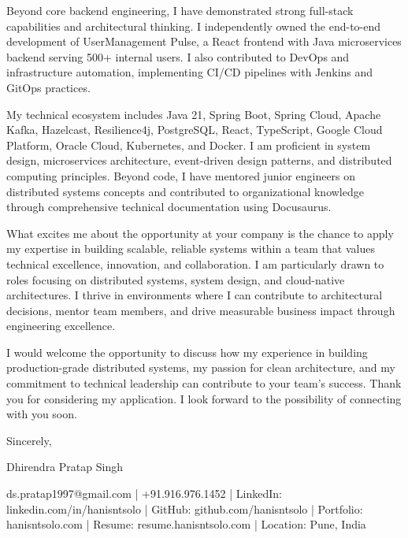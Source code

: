 \documentclass[]{hanisntsolo-resume}
\begin{document}
\vspace{0.1in}

Beyond core backend engineering, I have demonstrated strong full-stack capabilities and architectural thinking. I independently owned the end-to-end development of UserManagement Pulse, a React frontend with Java microservices backend serving 500+ internal users. I also contributed to DevOps and infrastructure automation, implementing CI/CD pipelines with Jenkins and GitOps practices.

\vspace{0.1in}

My technical ecosystem includes Java 21, Spring Boot, Spring Cloud, Apache Kafka, Hazelcast, Resilience4j, PostgreSQL, React, TypeScript, Google Cloud Platform, Oracle Cloud, Kubernetes, and Docker. I am proficient in system design, microservices architecture, event-driven design patterns, and distributed computing principles. Beyond code, I have mentored junior engineers on distributed systems concepts and contributed to organizational knowledge through comprehensive technical documentation using Docusaurus.

\vspace{0.1in}

What excites me about the opportunity at your company is the chance to apply my expertise in building scalable, reliable systems within a team that values technical excellence, innovation, and collaboration. I am particularly drawn to roles focusing on distributed systems, system design, and cloud-native architectures. I thrive in environments where I can contribute to architectural decisions, mentor team members, and drive measurable business impact through engineering excellence.

\vspace{0.1in}

I would welcome the opportunity to discuss how my experience in building production-grade distributed systems, my passion for clean architecture, and my commitment to technical leadership can contribute to your team's success. Thank you for considering my application. I look forward to the possibility of connecting with you soon.

\vspace{0.2in}

Sincerely,

\vspace{0.5in}

Dhirendra Pratap Singh

\vspace{0.1in}

ds.pratap1997@gmail.com | +91.916.976.1452 | LinkedIn: linkedin.com/in/hanisntsolo | GitHub: github.com/hanisntsolo | Portfolio: hanisntsolo.com | Resume: resume.hanisntsolo.com | Location: Pune, India
\end{document}
